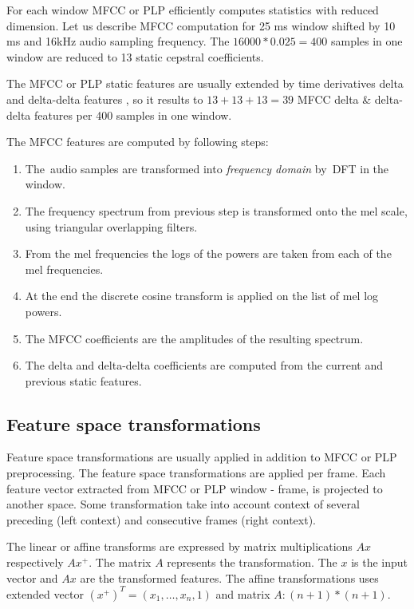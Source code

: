 For each window \ac{MFCC} or \ac{PLP} efficiently computes statistics with reduced dimension. 
Let us describe \ac{MFCC} computation for 25 ms window shifted by 10 ms and 16kHz audio sampling frequency. 
The $16000 * 0.025 = 400$ samples in one window are reduced to 13 static cepstral coefficients.

The \ac{MFCC} or \ac{PLP} static features are usually extended 
by time derivatives delta and delta-delta features \cite{psutka2001comparison},
so it results to $13 + 13 + 13 = 39$ \ac{MFCC} delta \& delta-delta features 
per 400 samples in one window.

The \ac{MFCC} features are computed by following steps:

\small{\begin{enumerate}
    \item The~audio samples are transformed into {\it frequency domain}\/ by~\ac{DFT} in the window.
    \item The frequency spectrum from previous step is transformed onto the mel scale, 
        using triangular overlapping filters.
    \item From the mel frequencies the logs of the powers are taken from each of the mel frequencies.
    \item At the end the discrete cosine transform is applied on the list of mel log powers.
    \item The \ac{MFCC} coefficients are the amplitudes of the resulting spectrum.
    \item The delta and delta-delta coefficients are computed from the current and previous static features.
\end{enumerate}

\subsection*{Feature space transformations}
Feature space transformations are usually applied in addition to \ac{MFCC} or \ac{PLP} preprocessing.
The feature space transformations are applied per frame. 
Each feature vector extracted from \ac{MFCC}
or \ac{PLP} window - frame, is projected to another space.
Some transformation take into account context of several 
preceding (left context) and consecutive frames (right context).

The linear or affine transforms are expressed by matrix multiplications $Ax$ respectively $Ax^+$.
The matrix $A$ represents the transformation. 
The $x$ is the input vector and $Ax$ are the transformed features.
The affine transformations uses extended vector $(x^+)^T = (x_1, \ldots, x_n, 1)$ and matrix $A: (n+1)*(n+1)$.

}
